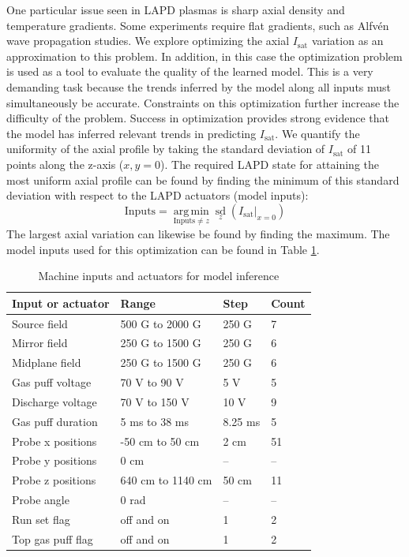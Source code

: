 
One particular issue seen in LAPD plasmas is sharp axial density and temperature gradients. Some experiments require flat gradients, such as Alfv\'en wave propagation studies. We explore optimizing the axial $I_\text{sat}$ variation as an approximation to this problem. 
In addition, in this case the optimization problem is used as a tool to evaluate the quality of the learned model. This is a very demanding task because the trends inferred by the model along all inputs must simultaneously be accurate. Constraints on this optimization further increase the difficulty of the problem. Success in optimization provides strong evidence that the model has inferred relevant trends in predicting $I_\text{sat}$.
We quantify the uniformity of the axial profile by taking the standard deviation of $I_\text{sat}$ of 11 points along the z-axis ($x,y=0$). The required LAPD state for attaining the most uniform axial profile can be found by finding the minimum of this standard deviation with respect to the LAPD actuators (model inputs):
\begin{equation}
	\text{Inputs} = \operatorname*{arg\,min}_{\text{Inputs} \neq z} \operatorname*{sd}_{z}(I_\text{sat}|_{x=0})
\end{equation}
The largest axial variation can likewise be found by finding the maximum. The model inputs used for this optimization can be found in Table \ref{tab:axial_optimization_inputs}. 

\begin{table}
	\small
	\centering
	\caption{Machine inputs and actuators for model inference}
	\label{tab:axial_optimization_inputs}
	\begin{tabular}{l l l l}
		Input or actuator & Range & Step & Count \\
		\hline
		Source field & 500 G to 2000 G & 250 G & 7 \\
		Mirror field & 250 G to 1500 G & 250 G & 6 \\
		Midplane field & 250 G to 1500 G & 250 G & 6 \\
		Gas puff voltage & 70 V to 90 V & 5 V & 5 \\
		Discharge voltage & 70 V to 150 V & 10 V & 9 \\
		Gas puff duration & 5 ms to 38 ms & 8.25 ms & 5\\
		Probe x positions & -50 cm to 50 cm & 2 cm & 51 \\
		Probe y positions & 0 cm & -- & -- \\
		Probe z positions & 640 cm to 1140 cm & 50 cm & 11 \\
		Probe angle & 0 rad & -- & --\\
		Run set flag & off and on & 1 & 2 \\
		Top gas puff flag & off and on & 1 & 2\\
		
	\end{tabular}
\end{table}

